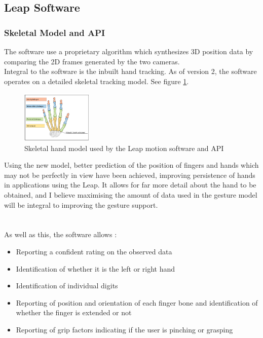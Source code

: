 \documentclass[a4paper]{article}
\begin{document}
	
\subsection{Leap Software}
\subsubsection{Skeletal Model and API}
The software use a proprietary algorithm which synthesizes 3D position data by comparing the 2D frames generated by the two cameras.\cite{Leap Specs}
\\ Integral to the software is the inbuilt hand tracking. As of version 2, the software operates on a detailed skeletal tracking model. See  figure \ref{skeletalModel}. \\

\begin{figure}[!h]
\centerline{\includegraphics[width=0.3\textwidth]{skeletal.png}}
\caption{Skeletal hand model used by the Leap motion software and API
\label{skeletalModel}\cite{skeletalGuide}}
\end{figure} 
Using the new model,  better prediction of the position of fingers and hands which may not be perfectly in view have been achieved, improving persistence of hands in applications using the Leap. It allows for far more detail about the hand to be obtained, and I believe maximising the amount of data used in the gesture model will be integral to improving the gesture support.\\\\\\
As well as this, the software allows :\\
\begin{itemize}
\item Reporting a confident rating on the observed data
\item Identification of whether it is the left or right hand
\item Identification of individual digits
\item Reporting of position and orientation of each finger bone and identification of whether the finger is extended or not
\item Reporting of grip factors indicating if the user is pinching or grasping
\end{itemize}\cite{skeletalGuide}
\end{document}
